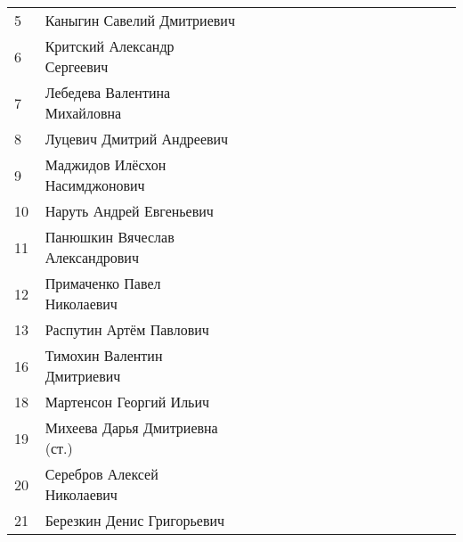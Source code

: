 \documentclass[a4paper,landscape,11pt]{article}
\newcommand*\ok{&{\small \ding{51}}} %
\newcommand*\no{&{\small }} %
\begin{document}
\begin{tabular}{p{7pt}|l|p{6pt}p{6pt}p{6pt}p{6pt}p{6pt}p{6pt}p{6pt}p{6pt}p{6pt}p{6pt}p{6pt}p{6pt}p{6pt}p{6pt}p{6pt}}
 5\,&Каныгин Савелий Дмитриевич         \ok\ok\ok\ok\ok\ok\ok\no\ok\ok\ok\ok\ok\ok\ok\\
 6\,&Критский Александр Сергеевич       \no\no\no\no\no\no\no\no\no\\
 7\,&Лебедева Валентина Михайловна      \ok\ok\ok\ok\ok\ok\ok\ok\ok\ok\ok\ok\ok\ok\ok\\
 8\,&Луцевич Дмитрий Андреевич          \ok\ok\ok\ok\ok\ok\ok\no\ok\ok\ok\ok\ok\\
 9\,&Маджидов Илёсхон Насимджонович     \no\no\no\no\no\no\no\no\no\\
10\,&Наруть Андрей Евгеньевич           \no\no\no\no\no\no\no\no\no\no\no\no\no\ok\no\\
11\,&Панюшкин Вячеслав Александрович    \ok\ok\ok\no\ok\ok\no\no\ok\ok\no\no\ok\ok\ok\\
\midrule
12\,&Примаченко Павел Николаевич        \ok\ok\ok\ok\ok\ok\ok\ok\ok\ok\ok\ok\ok\ok\ok\\
13\,&Распутин Артём Павлович            \ok\ok\no\no\no\no\ok\ok\no\no\ok\ok\no\ok\ok\\
16\,&Тимохин Валентин Дмитриевич        \ok\ok\ok\ok\ok\ok\ok\ok\ok\ok\ok\ok\no\ok\no\\
18\,&Мартенсон Георгий Ильич            \ok\ok\ok\ok\ok\ok\ok\ok\ok\ok\ok\ok\ok\ok\ok\\
19\,&Михеева Дарья Дмитриевна (ст.)     \ok\ok\ok\ok\ok\ok\ok\ok\ok\ok\ok\ok\ok\ok\ok\\
20\,&Серебров Алексей Николаевич        \ok\ok\ok\ok\ok\ok\no\ok\ok\ok\ok\ok\ok\ok\ok\\
21\,&Березкин Денис Григорьевич         \no\no\no\no\ok\ok\no\no\no\no\ok\ok\no\no\no\\
\bottomrule
\end{tabular} 
\newpage
%
\hspace{-5cm}
\end{document}
